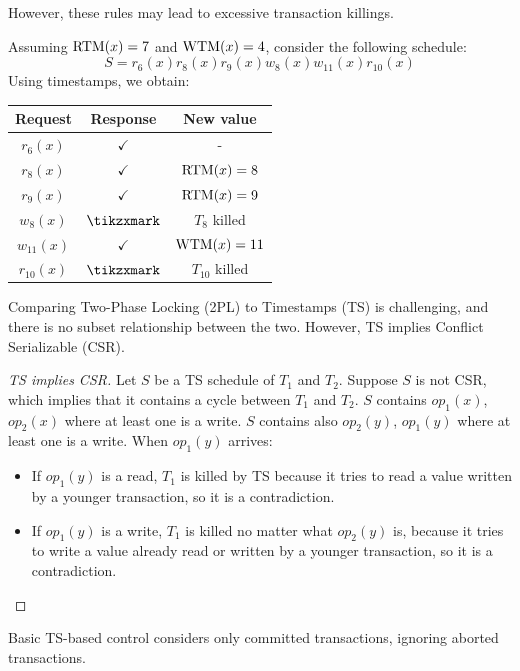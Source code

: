 However, these rules may lead to excessive transaction killings.
\begin{example}
    Assuming $\textnormal{RTM}(x)=7$ and $\textnormal{WTM}(x)=4$, consider the following schedule:
    \[S=r_6(x) r_8(x) r_9(x) w_8(x) w_{11}(x) r_{10}(x)\]
    Using timestamps, we obtain:
    \begin{table}[H]
        \centering
        \begin{tabular}{ccc}
        \textbf{Request} & \textbf{Response} & \textbf{New value} \\ \hline
        $r_6(x)$         & $\checkmark$      & -                  \\
        $r_8(x)$         & $\checkmark$      & $\textnormal{RTM}(x)=8$         \\
        $r_9(x)$         & $\checkmark$      & $\textnormal{RTM}(x)=9$         \\
        $w_8(x)$         & $\tikzxmark$      & $T_8$ killed       \\
        $w_{11}(x)$      & $\checkmark$      & $\textnormal{WTM}(x)=11$        \\
        $r_{10}(x)$      & $\tikzxmark$      & $T_{10}$ killed   
        \end{tabular}
    \end{table}
\end{example}
Comparing Two-Phase Locking (2PL) to Timestamps (TS) is challenging, and there is no subset relationship between the two. 
However, TS implies Conflict Serializable (CSR).
\begin{proof}[TS implies CSR]
    Let $S$ be a TS schedule of $T_1$ and $T_2$. Suppose $S$ is not CSR, which implies that it contains a cycle between $T_1$ and $T_2$. 
    $S$ contains $op_1(x)$, $op_2(x)$ where at least one is a write. 
    $S$ contains also $op_2(y)$, $op_1(y)$ where at least one is a write. 
    When $op_1(y)$ arrives:
    \begin{itemize}
        \item If $op_1(y)$ is a read, $T_1$ is killed by TS because it tries to read a value written by a younger transaction, so it is a contradiction. 
        \item If $op_1(y)$ is a write, $T_1$ is killed no matter what $op_2(y)$ is, because it tries to write a value already read or written by a younger transaction, so it is a contradiction. 
    \end{itemize}
\end{proof}
Basic TS-based control considers only committed transactions, ignoring aborted transactions. 
